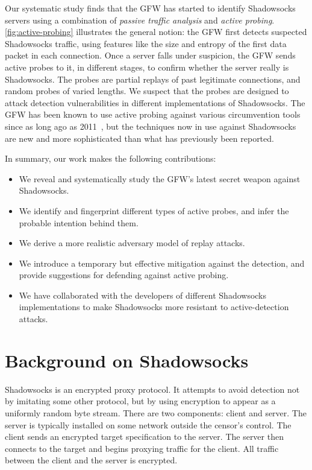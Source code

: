 \documentclass[sigconf,letterpaper]{acmart}
\begin{document}
Our systematic study
finds that the GFW has started to identify Shadowsocks servers
using a combination of \emph{passive traffic analysis} and \emph{active probing}.
\autoref{fig:active-probing} illustrates the general notion:
the GFW first detects suspected Shadowsocks traffic,
using features like the size and entropy of the first data packet in each connection.
Once a server falls under suspicion,
the GFW sends active probes to it, in different stages,
to confirm whether the server really is Shadowsocks.
The probes are partial replays of past legitimate connections, and random probes of varied lengths.
We suspect that the probes are designed to attack detection vulnerabilities in different implementations of Shadowsocks.
The GFW has been known to use active probing against various circumvention tools
since as long ago as 2011~\cite{Ensafi2015b},
but the techniques now in use against Shadowsocks are new
and more sophisticated than what has previously been reported.

In summary,
our work makes the following contributions:
\begin{itemize}
\item We reveal and systematically study the GFW's latest secret weapon against Shadowsocks.
\item We identify and fingerprint different types of active probes, and infer the probable intention behind them.
\item We derive a more realistic adversary model of replay attacks.
\item We introduce a temporary but effective mitigation against the detection, and provide suggestions for defending against active probing.
\item We have collaborated with the developers of different Shadowsocks implementations to make Shadowsocks more resistant to active-detection attacks.
\end{itemize}

\section{Background on Shadowsocks}
\label{sec:background}

Shadowsocks is an encrypted proxy protocol.
It attempts to avoid detection not by imitating some other protocol,
but by using encryption to appear as a uniformly random byte stream.
There are two components: client and server.
The server is typically installed
on some network outside the censor's control.
The client sends an encrypted target specification to the server.
The server then connects to the target and
begins proxying traffic for the client.
All traffic between the client and the server is encrypted.
\end{document}
